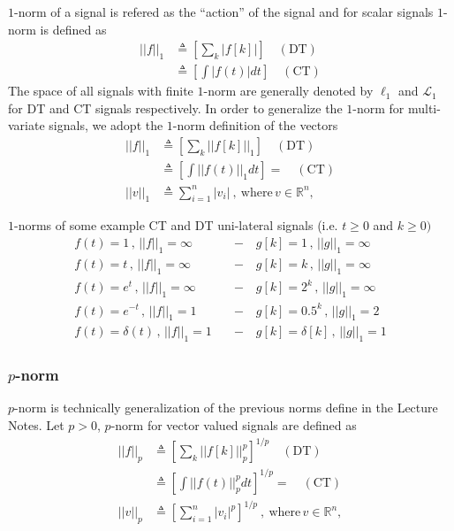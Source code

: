 \documentclass[twoside]{article}
\begin{document}
$1$-norm of a signal is refered as the ``action'' of the signal and for 
scalar signals $1$-norm is defined as
%
\begin{align*}
	|| f ||_{1} &\triangleq \left[ \sum\limits_k | f[k] | \right] \quad (\mathrm{DT})
	\\
	&\triangleq \left[ \int\limits | f(t) | dt \right] \quad (\mathrm{CT})
\end{align*}
%
The space of all signals with finite $1$-norm are generally denoted by 
$\ell_{1}$ and $\mathcal{L}_{1}$ for DT and CT signals respectively.
In order to generalize the $1$-norm for multi-variate signals, we adopt the $1$-norm
definition of the vectors 
%
\begin{align*}
	|| f ||_{1} &\triangleq 
	\left[ \sum\limits_k || f[k] ||_1 \right]
	\quad (\mathrm{DT})
	\\
	&\triangleq \left[ \int\limits || f(t) ||_1 dt \right]  = 
	\quad (\mathrm{CT})
\\
|| v ||_{1} &\triangleq \sum\limits_{i=1}^{n}  | v_i | \ , \ \mathrm{where} \, v \in \mathbb{R}^n , 
\end{align*}

$1$-norms of some example CT and DT uni-lateral signals (i.e. $t \geq 0$
and $k \geq 0)$
%
\begin{align*}
	f(t) = 1 \, , \, || f ||_{1} = \infty  \quad &- \quad g[k] = 1 \, , \, || g ||_{1} = \infty
	\\
	f(t) = t \, , \, || f ||_{1} = \infty \quad &- \quad g[k] = k \, , \, || g ||_{1} = \infty
		\\
	f(t) = e^t \, , \, || f ||_{1} = \infty \quad &- \quad g[k] = 2^k \, , \, || g ||_{1} = \infty
			\\
	f(t) = e^{-t} \, , \, || f ||_{1} = 1 \quad &- \quad g[k] = 0.5^k \, , \, || g ||_{1} = 2
				\\
	f(t) = \delta(t) \, , \, || f ||_{1} = 1 \quad &- \quad g[k] = \delta[k] \, , \, || g ||_{1} = 1
\end{align*}

\subsubsection*{$p$-norm} 

$p$-norm is technically generalization of the previous norms define in the Lecture Notes. Let $p > 0$, 
$p$-norm for vector valued signals are defined as
%
\begin{align*}
	|| f ||_{p} &\triangleq 
	\left[ \sum\limits_k || f[k] ||_p^p \right]^{1/p}
	\quad (\mathrm{DT})
	\\
	&\triangleq \left[ \int\limits || f(t) ||_p^p dt \right]^{1/p}  = 
	\quad (\mathrm{CT})
\\
|| v ||_{p} &\triangleq \left[ \sum\limits_{i=1}^{n}  | v_i |^p \right]^{1/p} \ , \ \mathrm{where} \, v \in \mathbb{R}^n , 
\end{align*}
\end{document}
